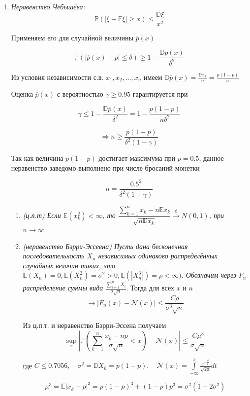 \documentclass[a4paper,12pt]{article}
\newcommand{\lt}{\left}
\newcommand{\rt}{\right}
\newcommand{\fr}{\frac}
\newcommand{\dfr}{\dfrac}
\newcommand{\ol}{\overline}
\newcommand{\bb}{\mathbb}
\begin{document}
\begin{enumerate}
\item

 {\it Неравенство Чебышёва:}
$$\bb P(|\xi - \bb E\xi|\geqslant x)\leqslant\fr{\bb D\xi}{x^2}$$

Применяем его для случайной величины ${\ol p(x)}$

$$\bb P(|{\ol p(x)} - p|\leqslant \delta)\geqslant 1 - \fr{\bb D\ol p(x)}{\delta^2}$$

Из условия независимости с.в. $x_1, x_2,\dots ,x_n$ имеем $\bb D \ol p(x) = \fr{\bb D x_k}{n} = \fr{p(1-p)}{n}$

Оценка $\ol p(x)$ с вероятностью $\gamma \geqslant 0.95$ гарантируется при 

$$\gamma \leqslant 1 - \fr{\bb D\ol p(x)}{\delta^2} = 1 - \fr{p(1-p)}{n\delta^2}$$

$$\Rightarrow n\geqslant \fr{p(1-p)}{\delta ^2(1 - \gamma)}$$

Так как величина $p(1 - p)$ достигает максимума при $p = 0.5$, данное неравенство заведомо выполнено при числе бросаний монетки 

$$n = \fr{0.5^2}{\delta^2(1-\gamma)}$$

\begin{enumerate}
\item {\it (ц.п.т) \it Если $\bb E(x_k^2) <\infty$, то $\dfr{\sum_{k =1}^{n}x_k - n\bb Ex_k}{\sqrt{n\bb Dx_k}} \xrightarrow{\text{d}} N(0,1)$, при $n\rightarrow\infty$}

\item {\it (неравенство Бэрри-Эссеена) Пусть дана бесконечная последовательность $X_n$ независимых одинаково распределённых случайных величин таких, что $\bb E(X_n) = 0, \bb E(X_n^2) = \sigma^2 > 0, \bb E(|X_n^3|) = \rho < \infty)$. Обозначим через $F_n$ распределение суммы вида $\fr{\sum\limits_{i = 1}^{n}X_i}{\sigma\sqrt{n}}$}. Тогда для всех $x$ и $n$ $$\rightarrow |F_n(x)- \mathcal{N}(x)|\leqslant \fr{C\rho}{\sigma^3\sqrt{n}}$$

Из ц.п.т. и неравенство Бэрри-Эссена получаем 
$$\sup\limits_{x}\lt| \bb P\lt(\sum\limits_{k = 1}^{n}\fr{x_k - np}{\sigma\sqrt{n}} < x\rt) - \mathcal{N}(x) \rt| \leqslant \fr{C\mu^3}{\sigma\sqrt{n}}$$

где $C\leqslant 0.7056,\quad \sigma ^2 = \bb D X_k = p(1-p),\quad \mathcal{N}(x) = \int\limits_{-\infty}^{x}\fr{e^{-\fr{t^2}{2}}}{\sqrt{2\pi}}dt$

$$\mu^3 = \bb E|x_k - p|^3 = p(1-p)^3 + (1-p)p^3 = \sigma^2(1 - 2\sigma^2)$$


\end{enumerate}
\end{enumerate}
\end{document}

